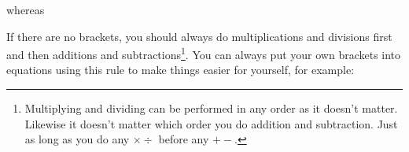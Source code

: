       \label{m38346*id173024}whereas\par 
      \label{m38346*uid12}\nopagebreak\noindent{}
      \label{m38346*id173063}If there are no brackets, you should always do multiplications and
divisions first and then additions and subtractions\label{m38346*uid13}\footnote{Multiplying and
dividing can be performed in any order as it doesn't matter. Likewise it
doesn't matter which order you do addition and subtraction. Just as long as
you do any $\ensuremath{\times}÷$ before any $+-$.}. You can always put your own brackets
into equations using this rule to make things easier for yourself, for example:\par 
      \label{m38346*uid14}\nopagebreak\noindent{}

